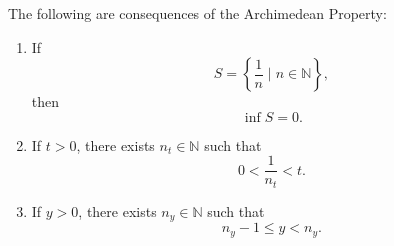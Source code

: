 \begin{corollary}\label{cor:archimedean-consequences}
    The following are consequences of the Archimedean Property:
    \begin{enumerate}[label=(\alph*)]
        \item If
        \[
            S = \left\{ \frac{1}{n} \mid n \in \mathbb{N} \right\},
        \]
        then
        \[
            \inf S = 0.
        \]

        \item If $t > 0$, there exists $n_t \in \mathbb{N}$ such that
        \[
            0 < \frac{1}{n_t} < t.
        \]

        \item If $y > 0$, there exists $n_y \in \mathbb{N}$ such that
        \[
            n_y - 1 \leq y < n_y.
        \]
    \end{enumerate}
\end{corollary}

